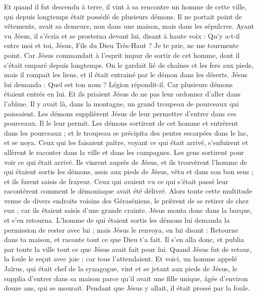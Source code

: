 \begin{multicols}{2}
Et quand il fut descendu à terre, il vint à sa rencontre un homme de cette ville, qui depuis longtemps était possédé de plusieurs démons. Il ne portait point de vêtements, avait sa demeure, non dans une maison, mais dans les sépulcres.
Ayant vu Jésus, il s'écria et se prosterna devant lui, disant à haute voix : Qu'y a-t-il entre moi et toi, Jésus, Fils du Dieu Très-Haut ? Je te prie, ne me tourmente point.
Car Jésus commandait à l'esprit impur de sortir de cet homme, dont il s'était emparé depuis longtemps. On le gardait lié de chaînes et les fers aux pieds, mais il rompait les liens, et il était entrainé par le démon dans les déserts.
Jésus lui demanda : Quel est ton nom ? Légion répondit-il. Car plusieurs démons étaient entrés en lui.
Et ils priaient Jésus de ne pas leur ordonner d'aller dans l'abîme.
Il y avait là, dans la montagne, un grand troupeau de pourceaux qui paissaient. Les démons supplièrent Jésus de leur permettre d'entrer dans ces pourceaux. Il le leur permit.
Les démons sortirent de cet homme et entrèrent dans les pourceaux ; et le troupeau se précipita des pentes escarpées dans le lac, et se noya.
Ceux qui les faisaient paître, voyant ce qui était arrivé, s'enfuirent et allèrent le raconter dans la ville et dans les campagnes.
Les gens sortirent pour voir ce qui était arrivé. Ils vinrent auprès de Jésus, et ils trouvèrent l'homme de qui étaient sortis les démons, assis aux pieds de Jésus, vêtu et dans son bon sens ; et ils furent saisis de frayeur.
Ceux qui avaient vu ce qui s'était passé leur racontèrent comment le démoniaque avait été délivré.
Alors toute cette multitude venue de divers endroits voisins des Géraséniens, le prièrent de se retirer de chez eux ; car ils étaient saisis d'une grande crainte. Jésus monta donc dans la barque, et s'en retourna.
L'homme de qui étaient sortis les démons lui demanda la permission de rester avec lui ; mais Jésus le renvoya, en lui disant :
Retourne dans ta maison, et raconte tout ce que Dieu t'a fait. Il s'en alla donc, et publia par toute la ville tout ce que Jésus avait fait pour lui.
Quand Jésus fut de retour, la foule le reçut avec joie ; car tous l'attendaient.
Et voici, un homme appelé Jaïrus, qui était chef de la synagogue, vint et se jetant aux pieds de Jésus, le supplia d'entrer dans sa maison
parce qu'il avait une fille unique, âgée d'environ douze ans, qui se mourait. Pendant que Jésus y allait, il était pressé par la foule.

\end{multicols}
